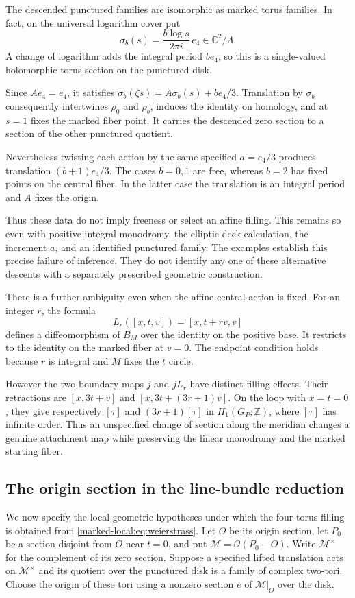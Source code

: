 The descended punctured families are isomorphic as
marked torus families. In fact, on the universal logarithm cover put
\[
 \sigma_b(s)=\frac{b\log s}{2\pi i}\,e_4\in\mathbb C^2/\Lambda.
\]
A change of logarithm adds the integral period $be_4$, so this is a
single-valued holomorphic torus section on the punctured disk.

Since $Ae_4=e_4$, it satisfies
$\sigma_b(\zeta s)=A\sigma_b(s)+be_4/3$.
Translation by $\sigma_b$ consequently intertwines $\rho_0$ and
$\rho_b$, induces the identity on homology, and at $s=1$ fixes the
marked fiber point. It carries the descended zero section to a
section of the other punctured quotient.

Nevertheless twisting each action by the same specified $a=e_4/3$
produces translation $(b+1)e_4/3$. The cases $b=0,1$ are free, whereas $b=2$ has fixed points on the central fiber.
In the latter case the translation is an integral period and $A$ fixes the origin.

Thus these data do not imply freeness or select an affine filling.
This remains so even with positive integral monodromy, the elliptic
deck calculation, the increment $a$, and an identified punctured family. The examples establish
this precise failure of inference. They do not identify any one
of these alternative descents with a separately prescribed geometric
construction.

There is a further ambiguity even when the affine central action is
fixed. For an integer $r$, the formula
\[
 L_r([x,t,v])=[x,t+rv,v]
\]
defines a diffeomorphism of $B_M$ over the identity on the positive base.
It restricts to the identity on the marked fiber at $v=0$. The endpoint condition holds because $r$ is integral
and $M$ fixes the $t$ circle.

However the two boundary maps $j$
and $jL_r$ have distinct filling effects. Their retractions are
$[x,3t+v]$ and $[x,3t+(3r+1)v]$.
On the loop with $x=t=0$, they give respectively $[\tau]$ and
$(3r+1)[\tau]$ in $H_1(G_P;\mathbb Z)$, where $[\tau]$ has
infinite order. Thus an unspecified change of section along the
meridian changes a genuine attachment map while preserving the
linear monodromy and the marked starting fiber.


\subsection{The origin section in the line-bundle reduction}

We now specify the local geometric hypotheses under which the
four-torus filling is obtained from \eqref{marked-local:eq:weierstrass}.
Let $O$ be its origin section, let $P_0$ be a section disjoint
from $O$ near $t=0$, and put $\mathcal M=\mathcal O(P_0-O)$.
Write $\mathcal M^\times$ for the complement of its zero section.
Suppose a specified lifted translation acts on $\mathcal M^\times$
and its quotient over the punctured disk is a family of complex
two-tori. Choose the origin of these tori using a nonzero section
$e$ of $\mathcal M|_O$ over the disk.

